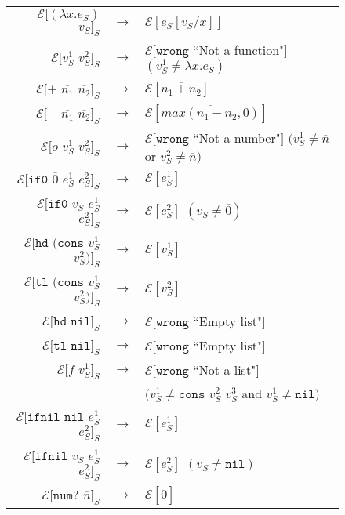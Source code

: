 \begin{figure}[p]
\centering
\begin{tabular}{rcl}
$\mathscr{E}[(\lambda x.e_{S})$ $v_{S}]_{S}$ & $\rightarrow$ & $\mathscr{E}[e_{S}[v_{S}/x]]$ \\
$\mathscr{E}[v_{S}^{1}$ $v_{S}^{2}]_{S}$ & $\rightarrow$ & $\mathscr{E}[\mathtt{wrong}$ ``Not a function"$]$ $(v_{S}^{1}\neq\lambda x.e_{S})$ \\
$\mathscr{E}[+$ $\overline{n_{1}}$ $\overline{n_{2}}]_{S}$ & $\rightarrow$ & $\mathscr{E}[\overline{n_{1}+n_{2}}]$ \\
$\mathscr{E}[-$ $\overline{n_{1}}$ $\overline{n_{2}}]_{S}$ & $\rightarrow$ & $\mathscr{E}[\overline{max(n_{1}-n_{2},0)}]$ \\
$\mathscr{E}[o$ $v_{S}^{1}$ $v_{S}^{2}]_{S}$ & $\rightarrow$ & $\mathscr{E}[\mathtt{wrong}$ ``Not a number"$]$ $(v_{S}^{1}\neq\overline{n}$ or $v_{S}^{2}\neq\overline{n})$ \\
$\mathscr{E}[\mathtt{if0}$ $\overline{0}$ $e_{S}^{1}$ $e_{S}^{2}]_{S}$ & $\rightarrow$ & $\mathscr{E}[e_{S}^{1}]$ \\
$\mathscr{E}[\mathtt{if0}$ $v_{S}$ $e_{S}^{1}$ $e_{S}^{2}]_{S}$ & $\rightarrow$ & $\mathscr{E}[e_{S}^{2}]$ $(v_{S}\neq\overline{0})$ \\
$\mathscr{E}[\mathtt{hd}$ $(\mathtt{cons}$ $v_{S}^{1}$ $v_{S}^{2})]_{S}$ & $\rightarrow$ & $\mathscr{E}[v_{S}^{1}]$ \\
$\mathscr{E}[\mathtt{tl}$ $(\mathtt{cons}$ $v_{S}^{1}$ $v_{S}^{2})]_{S}$ & $\rightarrow$ & $\mathscr{E}[v_{S}^{2}]$ \\
$\mathscr{E}[\mathtt{hd}$ $\mathtt{nil}]_{S}$ & $\rightarrow$ & $\mathscr{E}[\mathtt{wrong}$ ``Empty list"$]$ \\
$\mathscr{E}[\mathtt{tl}$ $\mathtt{nil}]_{S}$ & $\rightarrow$ & $\mathscr{E}[\mathtt{wrong}$ ``Empty list"$]$ \\
$\mathscr{E}[f$ $v_{S}^{1}]_{S}$ & $\rightarrow$ & $\mathscr{E}[\mathtt{wrong}$ ``Not a list"$]$ \\
&& $(v_{S}^{1}\neq\mathtt{cons}$ $v_{S}^{2}$ $v_{S}^{3}$ and $v_{S}^{1}\neq\mathtt{nil})$ \\
$\mathscr{E}[\mathtt{ifnil}$ $\mathtt{nil}$ $e_{S}^{1}$ $e_{S}^{2}]_{S}$ & $\rightarrow$ & $\mathscr{E}[e_{S}^{1}]$ \\
$\mathscr{E}[\mathtt{ifnil}$ $v_{S}$ $e_{S}^{1}$ $e_{S}^{2}]_{S}$ & $\rightarrow$ & $\mathscr{E}[e_{S}^{2}]$ $(v_{S}\neq\mathtt{nil})$ \\
$\mathscr{E}[\mathtt{num?}$ $\overline{n}]_{S}$ & $\rightarrow$ & $\mathscr{E}[\overline{0}]$ \\

\end{tabular}
\end{figure}
